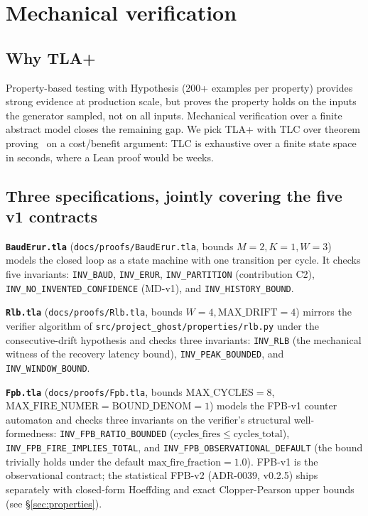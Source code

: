 \documentclass[acmsmall,nonacm=true,review=false]{acmart}
\theoremstyle{plain}
\begin{document}
\section{Mechanical verification}
\label{sec:mechanical}

\subsection{Why TLA+}
Property-based testing with Hypothesis (200+ examples per property)
provides strong evidence at production scale, but proves the property
holds on the inputs the generator sampled, not on all inputs.
Mechanical verification over a finite abstract model closes the
remaining gap. We pick TLA+ with TLC over theorem
proving~\cite{lamport2002specifying} on a cost/benefit argument: TLC
is exhaustive over a finite state space in seconds, where a Lean
proof would be weeks.

\subsection{Three specifications, jointly covering the five v1 contracts}
\textbf{\texttt{BaudErur.tla}} (\texttt{docs/proofs/BaudErur.tla},
bounds $M{=}2, K{=}1, W{=}3$) models the closed loop as a state
machine with one transition per cycle. It checks five invariants:
\texttt{INV\_BAUD}, \texttt{INV\_ERUR}, \texttt{INV\_PARTITION}
(contribution C2), \texttt{INV\_NO\_INVENTED\_CONFIDENCE} (MD-v1),
and \texttt{INV\_HISTORY\_BOUND}.

\textbf{\texttt{Rlb.tla}} (\texttt{docs/proofs/Rlb.tla}, bounds
$W{=}4, \mathrm{MAX\_DRIFT}{=}4$) mirrors the verifier algorithm of
\texttt{src/project\_ghost/properties/rlb.py} under the
consecutive-drift hypothesis and checks three invariants:
\texttt{INV\_RLB} (the mechanical witness of the recovery latency bound),
\texttt{INV\_PEAK\_BOUNDED}, and \texttt{INV\_WINDOW\_BOUND}.

\textbf{\texttt{Fpb.tla}} (\texttt{docs/proofs/Fpb.tla}, bounds
$\mathrm{MAX\_CYCLES}{=}8$, $\mathrm{MAX\_FIRE\_NUMER}{=}\mathrm{BOUND\_DENOM}{=}1$)
models the FPB-v1 counter automaton and checks three invariants on
the verifier's structural well-formedness:
\texttt{INV\_FPB\_RATIO\_BOUNDED}
($\mathrm{cycles\_fires} \le \mathrm{cycles\_total}$),
\texttt{INV\_FPB\_FIRE\_IMPLIES\_TOTAL}, and
\texttt{INV\_FPB\_OBSERVATIONAL\_DEFAULT} (the bound trivially holds
under the default $\mathrm{max\_fire\_fraction} = 1.0$). FPB-v1 is
the observational contract; the statistical FPB-v2 (ADR-0039,
v0.2.5) ships separately with closed-form Hoeffding and exact
Clopper-Pearson upper bounds (see \S\ref{sec:properties}).
\end{document}
